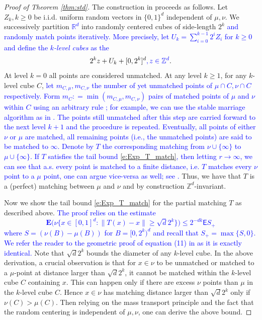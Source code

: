\documentclass[12pt]{article}
\newcommand{\R}{\mathbb{R}}
\newcommand{\Z}{\mathbb{Z}}
\newcommand{\1}{\mathbf{1}}
\newcommand{\RL}[1]{\textcolor{blue}{#1}}
\newcommand{\RL}[1]{#1}%
\renewcommand{\footnote}[1]{}
\begin{document}
{{{{{\begin{proof}[Proof of Theorem \ref{thm:std}]
 {The  construction in \cite[Theorem 1(ii)]{holroyd2009poisson} proceeds as follows. Let $ Z_k,k\geqslant 0$  be i.i.d. uniform random vectors in $\{0,1\}^d$ independent of $\mu,\nu$. We successively partition \RL{$\R^d$} into  %
  randomly centered cubes of side-length $2^k$ \RL{ and randomly match points iteratively. More precisely, let    $ {U_k} = \sum_{i=0}^{k-1}2^iZ_i$  for $k \geq 0$ and define the   {\it $k$-level cubes} as the}
%
$$2^kz +U_{ k} +  [0,2^k]^d \RL{, z\in \mathbb{Z} ^{ d}}%
.$$
%
At level $k=0$ all points are considered unmatched. At any level $k\geqslant 1$, for any $ k$-level cube $ C$, \RL{let $ m_{ C,\mu },m_{ C,\nu }$ the number of yet unmatched points  of $ \mu \cap C,\nu \cap C$ respectively. Form $ m_{ C}: = \min(m_{ C,\mu },m_{ C,\nu })$ pairs of matched points of  $\mu$ and $\nu$ within $ C$ using an arbitrary rule ; for example, we can use the stable marriage algorithm  as in \cite{hoffman2006stable}.  The points still unmatched  after this step are carried forward to the next level $ k + 1$ and the procedure is repeated.   Eventually, all points of either $ \nu$ or $ \mu$ are matched, all remaining points (i.e., the unmatched points) are said to be matched to $ \infty $. Denote by $ T$ the corresponding matching from $\nu \cup \{\infty\}$ to $\mu \cup \{\infty\}$. If $T$   satisfies the tail bound \eqref{e:Exp_T_match}, then letting $r \to \infty$, we can see that a.s. every point is matched to a finite distance, i.e. $T$ matches every $\nu$ point to a $\mu$ point, one can argue vice-versa as well; see \cite[Lemma 7]{holroyd2009poisson}.} Thus, we have that $T$ is a (perfect) matching between $\mu$ and $\nu$ and by construction $\Z^d$-invariant.  

Now we show the tail bound \eqref{e:Exp_T_match} for the partial matching $T$ as described above. \RL{The proof relies on the estimate 
%
$$ \mathbf{E}\Big(  {\nu} \{x \in [0,1]^d : \|T(x) - x\| \geqslant  \sqrt{d}2^k\} \Big) \leqslant  2^{-dk}\mathsf{E}S_{+}$$ 
%
where $S = (\nu(B) - \mu(B))$ for $B = [0,2^k)^d$ and recall that $S_+ = \max\{S,0\}$.  We refer the reader to the geometric proof of equation (11) in \cite{holroyd2009poisson} as it is exactly identical.} {Note that $\sqrt{d}2^k$ bounds the diameter of any $k$-level cube. In the above derivation, a crucial observation is that for  $x \in \nu$ to be unmatched or matched to a $\mu$-point at distance larger than $\sqrt{d}2^k$, it cannot be matched within the $k$-level cube $C$ containing $x$.    This can happen only if there are excess $\nu$ points than $\mu$ in the $k$-level cube $C$. Hence $x \in \nu$ has matching distance larger than $\sqrt{d}2^k$ only if $\nu(C) > \mu(C)$. Then relying on the mass transport principle and the fact that the random centering is independent of $\mu,\nu$, one can derive the above bound.}
%

}
\end{proof}}}}}}
\end{document}
